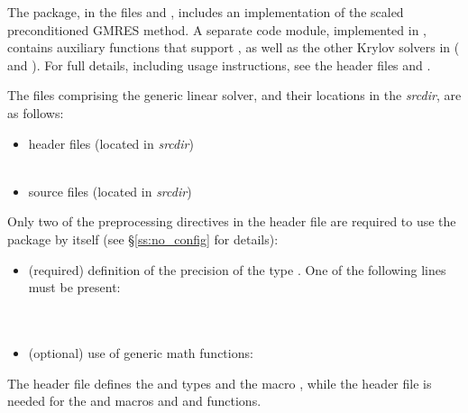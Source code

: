 The {\spgmr} package, in the files  and
, includes an implementation of the scaled
preconditioned GMRES method.  A separate code
module, implemented in , contains
auxiliary functions that support {\spgmr}, as well as the other Krylov
solvers in {\sundials} ({\spbcg} and {\sptfqmr}).
For full details, including usage instructions, see the header
files  and .

The files comprising the {\spgmr} generic linear solver, and their locations
in the {\sundials} {\em srcdir}, are as follows:
\begin{itemize}
\item header files (located in {\em srcdir})\\
     \\
     
\item source files (located in {\em srcdir})\\
    
\end{itemize}
Only two of the preprocessing directives in the header file  
are required to use the {\spgmr} package by itself (see \S\ref{ss:no_config} for details):
\begin{itemize}
\item (required) definition of the precision of the {\sundials} type . 
  One of the following lines must be present:\\
  \\
  \\
\item (optional) use of generic math functions:\\
\end{itemize}
The  header file defines the {\sundials}
 and  types and the macro , while the 
 header file is needed for the  and  macros
and  and  functions.

